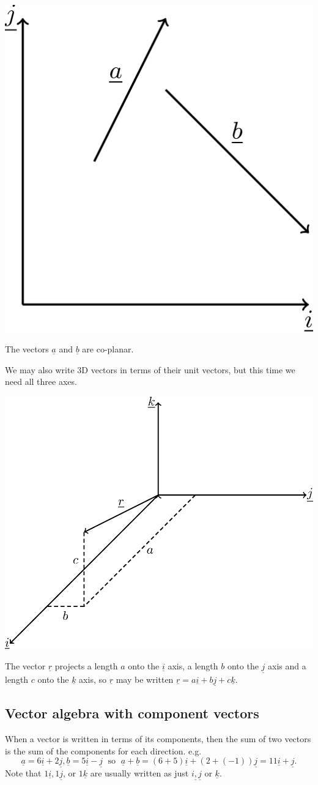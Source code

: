 \documentclass[
  11pt,
  oneside]{book}
\newcommand{\slide}{}
\theoremstyle{definition}
\theoremstyle{definition}
\theoremstyle{definition}
\theoremstyle{definition}
\theoremstyle{remark}
\begin{document}
\begin{center}\includegraphics[width=0.25\linewidth]{tikztopng-figure58} \end{center}

The vectors \(\underline a\) and \(\underline b\) are co-planar.

\slide

We may also write 3D vectors in terms of their unit vectors, but this time we need all three axes.

\begin{center}\includegraphics[width=0.35\linewidth]{tikztopng-figure59} \end{center}

The vector \(\underline r\) projects a length \(a\) onto the \(\underline i\) axis, a length \(b\) onto the \(\underline j\) axis and a length \(c\) onto the \(\underline k\) axis, so \(\underline r\) may be written \(\underline r = a\underline i + b\underline j + c\underline k\).

\slide

\subsection{Vector algebra with component vectors}\label{vector-algebra-with-component-vectors}

When a vector is written in terms of its components, then the sum of two vectors is the sum of the components for each direction. e.g.
\[
\underline a = 6\underline i + 2\underline j, \underline b = 5\underline i - \underline j\;\text{ so }\;\underline a + \underline b = (6 + 5)\underline i + (2 + (-1))\underline j = 11\underline i + \underline j.
\]
Note that \(1\underline i, 1\underline j\), or \(1\underline k\) are usually written as just \(i\underline , \underline j\) or \(\underline k\).
\end{document}
